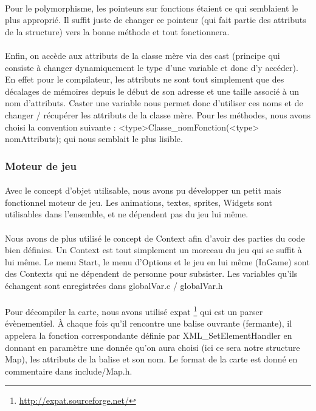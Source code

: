 \paragraph{} Pour le polymorphisme, les pointeurs sur fonctions étaient ce qui semblaient le plus approprié. Il suffit juste de changer ce pointeur (qui fait partie des attributs de la structure) vers la bonne méthode et tout fonctionnera.
\paragraph{} Enfin, on accède aux attributs de la classe mère via des cast (principe qui consiste à changer dynamiquement le type d'une variable et donc d'y accéder). En effet pour le compilateur, les attributs ne sont tout simplement que des décalages de mémoires depuis le début de son adresse et une taille associé à un nom d'attributs. Caster une variable nous permet donc d'utiliser ces noms et de changer / récupérer les attributs de la classe mère. Pour les méthodes, nous avons choisi la convention suivante : <type>Classe\_nomFonction(<type> nomAttributs); qui nous semblait le plus lisible.

\subsubsection{Moteur de jeu}

\paragraph{} Avec le concept d'objet utilisable, nous avons pu développer un petit mais fonctionnel moteur de jeu. Les animations, textes, sprites, Widgets sont utilisables dans l'ensemble, et ne dépendent pas du jeu lui même.
\paragraph{} Nous avons de plus utilisé le concept de Context afin d'avoir des parties du code bien définies. Un Context est tout simplement un morceau du jeu qui se suffit à lui même. Le menu Start, le menu d'Options et le jeu en lui même (InGame) sont des Contexts qui ne dépendent de personne pour subsister. Les variables qu'ils échangent sont enregistrées dans globalVar.c / globalVar.h
\paragraph{} Pour décompiler la carte, nous avons utilisé expat \footnote{\url{http://expat.sourceforge.net/}} qui est un parser évènementiel. À chaque fois qu'il rencontre une balise ouvrante (fermante), il appelera la fonction correspondante définie par XML\_SetElementHandler en donnant en paramètre une donnée qu'on aura choisi (ici ce sera notre structure Map), les attributs de la balise et son nom. Le format de la carte est donné en commentaire dans include/Map.h.
